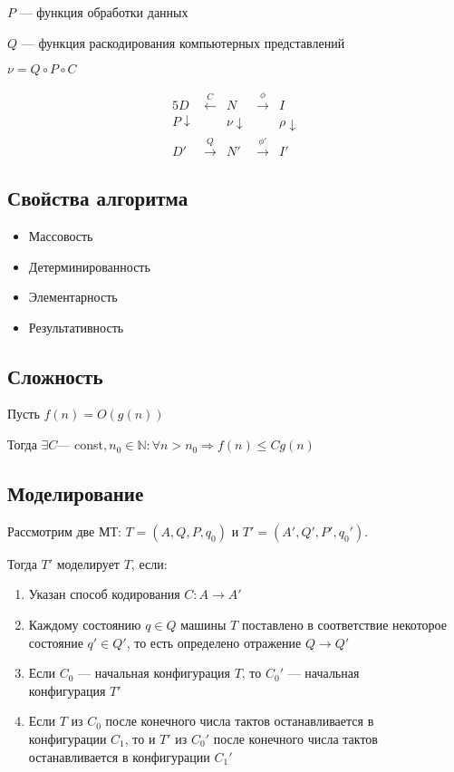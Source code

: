 \documentclass{article}
\begin{document}
$P$ --- функция обработки данных

$Q$ --- функция раскодирования компьютерных представлений

$\nu = Q \circ P \circ C$

\begin{alignat*}{5}
	D & \stackrel{C}{\longleftarrow} & N & \stackrel{\phi}{\longrightarrow} & I \\
	P \downarrow & & \nu \downarrow & & \rho \downarrow \\
	D' & \stackrel{Q}{\longrightarrow} & N' & \stackrel{\phi'}{\longrightarrow} & I'
\end{alignat*}

\subsection{Свойства алгоритма}

\begin{itemize}
	\item Массовость
	\item Детерминированность
	\item Элементарность
	\item Результативность
\end{itemize}

\subsection{Сложность}

Пусть $f(n) = O(g(n))$

Тогда $\exists C$--- const$, n_0 \in \mathbb{N} : \forall n > n_0 \Rightarrow f(n) \le C g(n)$

\subsection{Моделирование}

Рассмотрим две МТ: $T = (A, Q, P, q_0)$ и $T' = (A', Q', P', q_0')$.

Тогда $T'$ моделирует $T$, если:

\begin{enumerate}
	\item Указан способ кодирования $C: A \rightarrow A'$
	\item Каждому состоянию $q \in Q$ машины $T$ поставлено в соответствие некоторое 
	состояние $q' \in Q'$, то есть определено отражение $Q \rightarrow Q'$
	\item Если $C_0$ --- начальная конфигурация $T$, то $C_0'$ --- начальная \\
	конфигурация $T'$
	\item Если $T$ из $C_0$ после конечного числа тактов останавливается в \\
	конфигурации $C_1$, то и $T'$ из $C_0'$ после конечного числа тактов \\
	останавливается в конфигурации $C_1'$
\end{enumerate}
\end{document}
